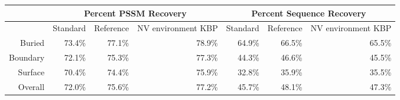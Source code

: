 \begin{tabular}{|r|r|r|r|r|r|r|}
\hline
 & \multicolumn{3}{c}{Percent PSSM Recovery} & \multicolumn{3}{|c|}{Percent Sequence Recovery}\\
\hline
  & Standard & Reference & NV environment KBP & Standard & Reference & NV environment KBP \\
\hline
Buried & 73.4\% & 77.1\% & 78.9\% & 64.9\% & 66.5\% & 65.5\% \\
\hline
Boundary & 72.1\% & 75.3\% & 77.3\% & 44.3\% & 46.6\% & 45.5\% \\
\hline
Surface & 70.4\% & 74.4\% & 75.9\% & 32.8\% & 35.9\% & 35.5\% \\
\hline
Overall & 72.0\% & 75.6\% & 77.2\% & 45.7\% & 48.1\% & 47.3\% \\
\hline
\end{tabular}